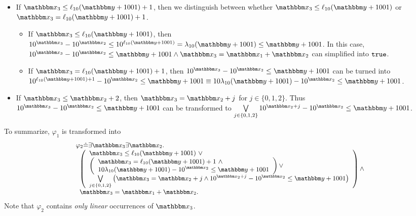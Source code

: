 {%
\begin{itemize}
\item If $\ivarx_3 \le \ell_{10}(\ivary+1001)+1$, then we distinguish between whether $\ivarx_3 \le \ell_{10}(\ivary+1001)$ or  $\ivarx_3 = \ell_{10}(\ivary+1001)+1$. 
\begin{itemize}
\item If $\ivarx_3 \le \ell_{10}(\ivary+1001)$, then $10^{\ivarx_3} - 10^{\ivarx_2} \le 10^{\ell_{10}(\ivary+1001)} = \lambda_{10}(\ivary+1001) \le \ivary + 1001$. In this case, $10^{\ivarx_3} - 10^{\ivarx_2} \le \ivary + 1001 \wedge \ivarx_3 = \ivarx_1 + \ivarx_2$ can simplified into $\mathtt{true}$.
%
\item If $\ivarx_3 = \ell_{10}(\ivary+1001)+1$, then $10^{\ivarx_3} - 10^{\ivarx_2} \le \ivary + 1001$ can be turned into $10^{\ell_{10}(\ivary+1001)+1} - 10^{\ivarx_2} \le \ivary + 1001 \equiv 10 \lambda_{10}(\ivary+1001) - 10^{\ivarx_2} \le \ivary + 1001 $.
\end{itemize} 
%
\item If $\ivarx_3 \le \ivarx_2 + 2$, then $\ivarx_3 = \ivarx_2 + j$ for $j \in \{0,1,2\}$. Thus $10^{\ivarx_3} - 10^{\ivarx_2} \le \ivary + 1001$ can be transformed to $\bigvee \limits_{j \in \{0,1,2\}} 10^{\ivarx_2 + j} - 10^{\ivarx_2} \le \ivary + 1001$.
\end{itemize}

To summarize, $\varphi_1$ is transformed into 
\[
\small
\begin{array}{l}
\varphi_2 \Def \exists \ivarx_3 \exists \ivarx_2. \\
\begin{array}{l}
\left(
\begin{array}{l}
\ivarx_3 \le \ell_{10}(\ivary+1001)\ \vee \\
\left(
\begin{array}{l}
\ivarx_3 = \ell_{10}(\ivary+1001)+1\ \wedge \\
10 \lambda_{10}(\ivary+1001) - 10^{\ivarx_2} \le \ivary + 1001 
\end{array}
\right) \vee \\
%
 \bigvee \limits_{j \in \{0,1,2\}}  \left(\ivarx_3 = \ivarx_2 +j \wedge 10^{\ivarx_2 + j} - 10^{\ivarx_2} \le \ivary + 1001\right)
\end{array}
\right) 
\wedge \\
 \ivarx_3 = \ivarx_1 + \ivarx_2.
 \end{array}
\end{array}
\]
Note that $\varphi_2$ contains \emph{only linear} occurrences of $\ivarx_3$.

}
